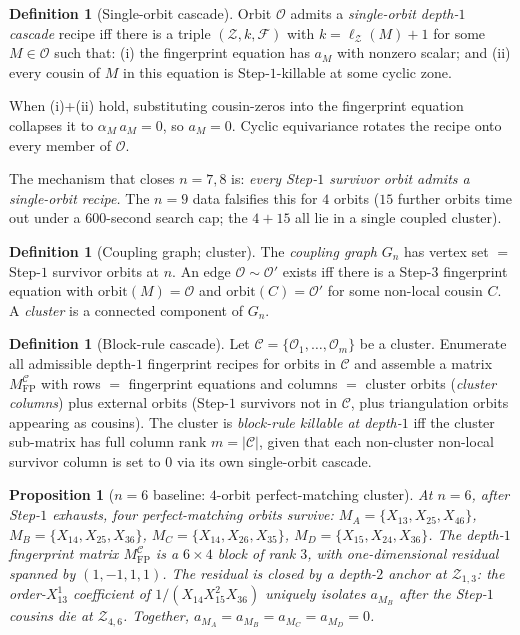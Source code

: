 \documentclass[11pt]{article}
\newtheorem{prop}[thm]{Proposition}
\theoremstyle{definition}
\newtheorem{defn}[thm]{Definition}
\begin{document}
\begin{defn}[Single-orbit cascade]
Orbit $\mathcal O$ admits a \emph{single-orbit depth-$1$ cascade}
recipe iff there is a triple $(\mathcal Z, k, \mathcal F)$ with
$k=\ell_{\mathcal Z}(M)+1$ for some $M\in\mathcal O$ such that:
(i) the fingerprint equation has $a_M$ with nonzero scalar; and
(ii) every cousin of $M$ in this equation is Step-$1$-killable at
some cyclic zone.
\end{defn}

When (i)+(ii) hold, substituting cousin-zeros into the fingerprint
equation collapses it to $\alpha_M\,a_M=0$, so $a_M=0$. Cyclic
equivariance rotates the recipe onto every member of $\mathcal O$.

The mechanism that closes $n=7,8$ is: \emph{every Step-$1$ survivor
orbit admits a single-orbit recipe.} The $n=9$ data falsifies this
for $4$ orbits ($15$ further orbits time out under a $600$-second
search cap; the $4+15$ all lie in a single coupled cluster).

\begin{defn}[Coupling graph; cluster]
The \emph{coupling graph} $G_n$ has vertex set $=$ Step-$1$
survivor orbits at $n$. An edge $\mathcal O \sim \mathcal O'$ exists
iff there is a Step-$3$ fingerprint equation with
$\mathrm{orbit}(M)=\mathcal O$ and $\mathrm{orbit}(C)=\mathcal O'$
for some non-local cousin $C$. A \emph{cluster} is a connected
component of $G_n$.
\end{defn}

\begin{defn}[Block-rule cascade]\label{def:block-rule}
Let $\mathcal C=\{\mathcal O_1,\dots,\mathcal O_m\}$ be a cluster.
Enumerate all admissible depth-$1$ fingerprint recipes for orbits
in $\mathcal C$ and assemble a matrix $M_{\mathrm{FP}}^{\mathcal C}$
with rows $=$ fingerprint equations and columns $=$ cluster orbits
(\emph{cluster columns}) plus external orbits (Step-$1$ survivors
not in $\mathcal C$, plus triangulation orbits appearing as
cousins). The cluster is \emph{block-rule killable at depth-$1$}
iff the cluster sub-matrix has full column rank
$m=|\mathcal C|$, given that each non-cluster non-local survivor
column is set to $0$ via its own single-orbit cascade.
\end{defn}

\begin{prop}[$n=6$ baseline: $4$-orbit perfect-matching cluster]\label{prop:n6}
At $n=6$, after Step-$1$ exhausts, four perfect-matching orbits
survive:
$M_A=\{X_{13},X_{25},X_{46}\}$,
$M_B=\{X_{14},X_{25},X_{36}\}$,
$M_C=\{X_{14},X_{26},X_{35}\}$,
$M_D=\{X_{15},X_{24},X_{36}\}$.
The depth-$1$ fingerprint matrix
$M_{\mathrm{FP}}^{\mathcal C}$ is a $6\times 4$ block of rank $3$,
with one-dimensional residual spanned by $(1,-1,1,1)$. The
residual is closed by a depth-$2$ anchor at
$\mathcal Z_{1,3}$: the order-$X_{13}^{1}$ coefficient of
$1/(X_{14}X_{15}^{2}X_{36})$ uniquely isolates $a_{M_B}$ after the
Step-$1$ cousins die at $\mathcal Z_{4,6}$.
Together, $a_{M_A}=a_{M_B}=a_{M_C}=a_{M_D}=0$.
\end{prop}
\end{document}
